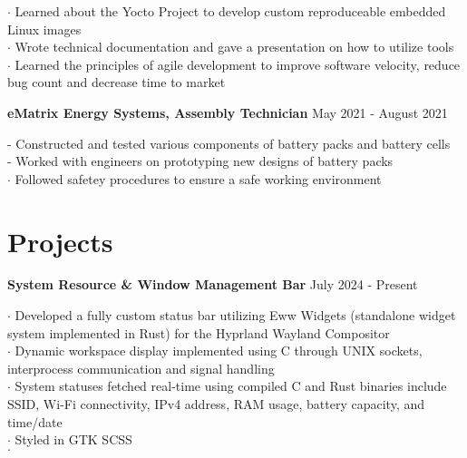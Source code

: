 \documentclass[letter,12pt]{article}
\begin{document}
$\cdot$ Learned about the Yocto Project to develop custom reproduceable 
embedded Linux images\\
$\cdot$ Wrote technical documentation and gave a presentation on 
how to utilize tools\\
$\cdot$ Learned the principles of agile development to improve software 
velocity, reduce bug count and decrease time to market\\
\pagebreak
\begin{tcolorbox}
[colback=gray!25,
  leftrule=0pt,
  rightrule=0pt,
  sharp corners]
 \textbf{eMatrix Energy Systems, Assembly Technician}
\hfill May 2021 - August 2021 
\end{tcolorbox}
\noindent 
- Constructed and tested various components of
battery packs and battery cells\\ 
- Worked with engineers on prototyping new designs of battery packs\\
$\cdot$ Followed safetey procedures to ensure a safe working environment
\vspace{-.5cm} 

\section*{Projects} 
\vspace{-.25cm}
\begin{tcolorbox}
[colback=gray!25,
  leftrule=0pt,
  rightrule=0pt,
  sharp corners]
  \textbf{System Resource \& Window Management Bar}
\hfill July 2024 - Present
\end{tcolorbox}
\noindent
$\cdot$ Developed a fully custom status bar utilizing Eww Widgets 
(standalone widget system implemented in Rust) for the Hyprland Wayland 
Compositor\\
$\cdot$ Dynamic workspace display implemented using C through UNIX sockets, interprocess 
communication and signal handling\\
$\cdot$ System statuses fetched real-time using compiled C and Rust binaries include
SSID, Wi-Fi connectivity, IPv4 address, RAM usage, battery capacity, and time/date\\
$\cdot$ Styled in GTK SCSS \\
$\cdot$ \href{https://github.com/DMGDy/eww-bar}
{}
\end{document}

